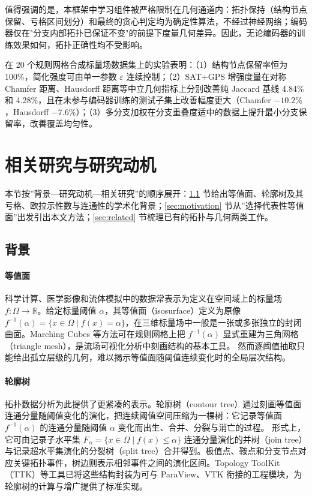 \documentclass[twocolumn, a4paper, 10pt]{article}
\begin{document}
值得强调的是，本框架中学习组件被严格限制在几何通道内：拓扑保持（结构节点保留、亏格区间划分）和最终的贪心判定均为确定性算法，不经过神经网络；编码器仅在"分支内部拓扑已保证不变"的前提下度量几何差异。因此，无论编码器的训练效果如何，拓扑正确性均不受影响。

在 20 个规则网格合成标量场数据集上的实验表明：（1）结构节点保留率恒为 100\%，简化强度可由单一参数 $\varepsilon$ 连续控制；（2）SAT+GPS 增强度量在对称 Chamfer 距离、Hausdorff 距离等中立几何指标上分别改善纯 Jaccard 基线 4.84\% 和 4.28\%，且在未参与编码器训练的测试子集上改善幅度更大（Chamfer $-10.2\%$，Hausdorff $-7.6\%$）；（3）多分支加权在分支重叠度适中的数据上提升最小分支保留率，改善覆盖均匀性。

\section{相关研究与研究动机}

本节按”背景—研究动机—相关研究”的顺序展开：\ref{sec:background} 节给出等值面、轮廓树及其亏格、欧拉示性数与连通性的学术化背景；\ref{sec:motivation} 节从”选择代表性等值面”出发引出本文方法；\ref{sec:related} 节梳理已有的拓扑与几何两类工作。

\subsection{背景}
\label{sec:background}

\paragraph{等值面}科学计算、医学影像和流体模拟中的数据常表示为定义在空间域上的标量场 $f:\Omega\rightarrow\mathbb{R}$。给定标量阈值 $\alpha$，其等值面（isosurface）定义为原像 $f^{-1}(\alpha)=\{x\in\Omega\mid f(x)=\alpha\}$，在三维标量场中一般是一张或多张独立的封闭曲面。Marching Cubes 等方法可在规则网格上把 $f^{-1}(\alpha)$ 显式重建为三角网格（triangle mesh），是流场可视化分析中刻画结构的基本工具。\cite{lorensen_cline_1987} 然而逐阈值抽取只能给出孤立层级的几何，难以揭示等值面随阈值连续变化时的全局层次结构。

\paragraph{轮廓树}拓扑数据分析为此提供了更紧凑的表示。轮廓树（contour tree）通过刻画等值面连通分量随阈值变化的演化，把连续阈值空间压缩为一棵树：它记录等值面 $f^{-1}(\alpha)$ 的连通分量随阈值 $\alpha$ 变化而出生、合并、分裂与消亡的过程。\cite{van_kreveld_1997,carr_contour_2003} 形式上，它可由记录子水平集 $F_\alpha=\{x\in\Omega\mid f(x)\leq\alpha\}$ 连通分量演化的并树（join tree）与记录超水平集演化的分裂树（split tree）合并得到。极值点、鞍点和分支节点对应关键拓扑事件，树边则表示相邻事件之间的演化区间。Topology ToolKit（TTK）等工具已将这些结构封装为可与 ParaView、VTK 衔接的工程模块，为轮廓树的计算与增广提供了标准实现。\cite{tierny_ttk_2018}
\end{document}
